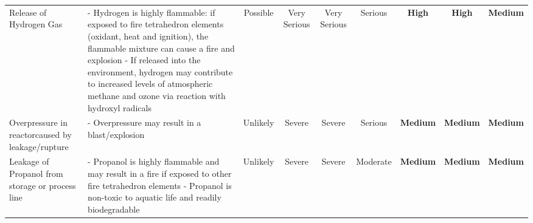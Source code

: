 \begin{table}
\begin{tabularx}{\linewidth}{|p{3cm}|X|c|c|c|c|c|c|c|}
Release of  Hydrogen Gas                                                       & - Hydrogen is highly flammable: if exposed     to fire tetrahedron elements (oxidant, heat    and ignition), the flammable mixture can      cause a fire and explosion  - If released into the environment, hydrogen     may contribute to increased levels of     atmospheric methane and ozone via reaction     with hydroxyl radicals & Possible                              & Very  Serious       & Very Serious          & Serious                                                               & \cellcolor[HTML]{FD6864}\textbf{High}                         & \cellcolor[HTML]{FD6864}\textbf{High}                           & \cellcolor[HTML]{FCFF2F}\textbf{Medium}                                 \\
Overpressure in  reactorcaused by  leakage/rupture                           & - Overpressure may result in a blast/explosion                                                                                                                                                                                                                                                                                                                                                 & Unlikely                              & Severe                                                        & Severe                                                          & Serious                                                               & \cellcolor[HTML]{FCFF2F}\textbf{Medium}                       & \cellcolor[HTML]{FCFF2F}\textbf{Medium}                         & \cellcolor[HTML]{FCFF2F}\textbf{Medium}                                 \\
Leakage of Propanol  from storage or  process line                           & - Propanol is highly flammable and may result in    a fire if exposed to other fire tetrahedron elements - Propanol is non-toxic to aquatic life and readily     biodegradable                                                                                                                                                                   & Unlikely                              & Severe                                                        & Severe                                                          & Moderate                                                              & \cellcolor[HTML]{FCFF2F}\textbf{Medium}                       & \cellcolor[HTML]{FCFF2F}\textbf{Medium}                         & \cellcolor[HTML]{FCFF2F}\textbf{Medium}                                 \\

\end{tabularx}
\end{table}
